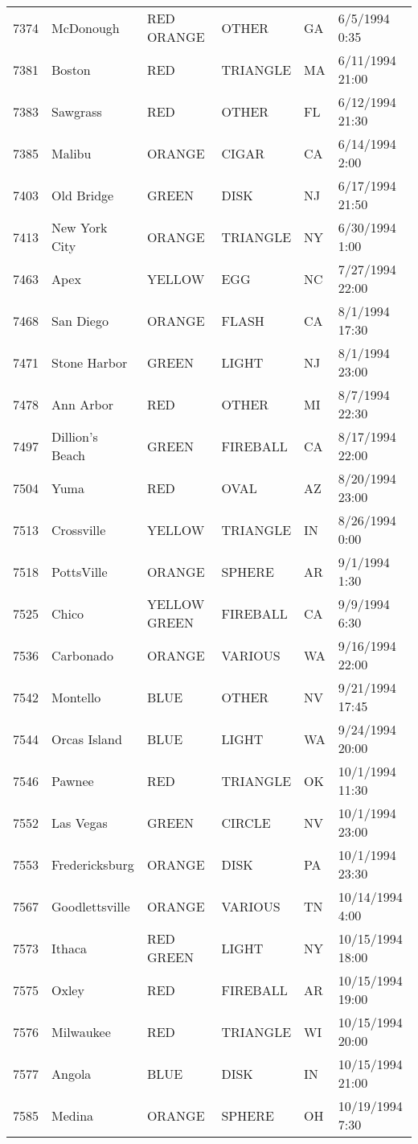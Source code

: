 \begin{tabular}{llllll}
7374 & McDonough & RED ORANGE & OTHER & GA & 6/5/1994 0:35 \\
7381 & Boston & RED & TRIANGLE & MA & 6/11/1994 21:00 \\
7383 & Sawgrass & RED & OTHER & FL & 6/12/1994 21:30 \\
7385 & Malibu & ORANGE & CIGAR & CA & 6/14/1994 2:00 \\
7403 & Old Bridge & GREEN & DISK & NJ & 6/17/1994 21:50 \\
7413 & New York City & ORANGE & TRIANGLE & NY & 6/30/1994 1:00 \\
7463 & Apex & YELLOW & EGG & NC & 7/27/1994 22:00 \\
7468 & San Diego & ORANGE & FLASH & CA & 8/1/1994 17:30 \\
7471 & Stone Harbor & GREEN & LIGHT & NJ & 8/1/1994 23:00 \\
7478 & Ann Arbor & RED & OTHER & MI & 8/7/1994 22:30 \\
7497 & Dillion's Beach & GREEN & FIREBALL & CA & 8/17/1994 22:00 \\
7504 & Yuma & RED & OVAL & AZ & 8/20/1994 23:00 \\
7513 & Crossville & YELLOW & TRIANGLE & IN & 8/26/1994 0:00 \\
7518 & PottsVille & ORANGE & SPHERE & AR & 9/1/1994 1:30 \\
7525 & Chico & YELLOW GREEN & FIREBALL & CA & 9/9/1994 6:30 \\
7536 & Carbonado & ORANGE & VARIOUS & WA & 9/16/1994 22:00 \\
7542 & Montello & BLUE & OTHER & NV & 9/21/1994 17:45 \\
7544 & Orcas Island & BLUE & LIGHT & WA & 9/24/1994 20:00 \\
7546 & Pawnee & RED & TRIANGLE & OK & 10/1/1994 11:30 \\
7552 & Las Vegas & GREEN & CIRCLE & NV & 10/1/1994 23:00 \\
7553 & Fredericksburg & ORANGE & DISK & PA & 10/1/1994 23:30 \\
7567 & Goodlettsville & ORANGE & VARIOUS & TN & 10/14/1994 4:00 \\
7573 & Ithaca & RED GREEN & LIGHT & NY & 10/15/1994 18:00 \\
7575 & Oxley & RED & FIREBALL & AR & 10/15/1994 19:00 \\
7576 & Milwaukee & RED & TRIANGLE & WI & 10/15/1994 20:00 \\
7577 & Angola & BLUE & DISK & IN & 10/15/1994 21:00 \\
7585 & Medina & ORANGE & SPHERE & OH & 10/19/1994 7:30 \\

\end{tabular}
